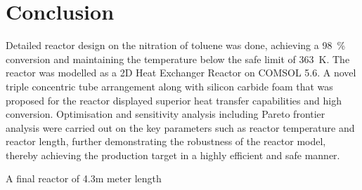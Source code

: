 \section{Conclusion} \label{sec:conclusion}
Detailed reactor design on the nitration of toluene was done, achieving a \SI{98}{\%} conversion and maintaining the temperature below the safe limit of \SI{363}{\K}. The reactor was modelled as a 2D Heat Exchanger Reactor on COMSOL 5.6. A novel triple concentric tube arrangement along with silicon carbide foam that was proposed for the reactor displayed superior heat transfer capabilities and high conversion. Optimisation and sensitivity analysis including Pareto frontier analysis were carried out on the key parameters such as reactor temperature and reactor length, further demonstrating the robustness of the reactor model, thereby achieving the production target in a highly efficient and safe manner.  

A final reactor of 4.3m meter length 